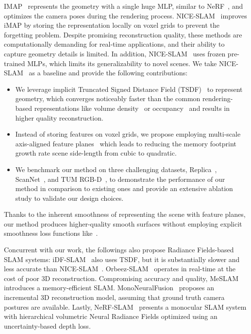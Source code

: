 IMAP~\cite{sucar2021imap} represents the geometry with a single huge MLP, similar to NeRF~\cite{mildenhall2020nerf}, and optimizes the camera poses during the rendering process. NICE-SLAM~\cite{zhu2022nice} improves iMAP by storing the representation locally on voxel grids to prevent the forgetting problem. Despite promising reconstruction quality, these methods are computationally demanding for real-time applications, and their ability to capture geometry details is limited. In addition, NICE-SLAM~\cite{zhu2022nice} uses frozen pre-trained MLPs, which limits its generalizability to novel scenes. We take NICE-SLAM~\cite{zhu2022nice} as a baseline and provide the following contributions:
\begin{itemize}
	\item We leverage implicit Truncated Signed Distance Field (TSDF)~\cite{azinovic2022neural} to represent geometry, which converges noticeably faster than the common rendering-based representations like volume density~\cite{sucar2021imap} or occupancy~\cite{zhu2022nice} and results in higher quality reconstruction.
	
	\item Instead of storing features on voxel grids, we propose employing multi-scale axis-aligned feature planes~\cite{chan2022efficient} which leads to reducing the memory footprint growth rate \wrt scene side-length from cubic to quadratic.
	
	\item We benchmark our method on three challenging datasets, Replica~\cite{replica19arxiv}, ScanNet~\cite{dai2017scannet}, and TUM RGB-D~\cite{sturm2012benchmark}, to demonstrate the performance of our method in comparison to existing ones and provide an extensive ablation study to validate our design choices. 
	
\end{itemize}
Thanks to the inherent smoothness of representing the scene with feature planes, our method produces higher-quality smooth surfaces without employing explicit smoothness loss functions like~\cite{wang2022go}.

Concurrent with our work, the followings also propose Radiance Fields-based SLAM systems: iDF-SLAM~\cite{ming2022idf} also uses TSDF, but it is substantially slower and less accurate than NICE-SLAM~\cite{zhu2022nice}. Orbeez-SLAM~\cite{chung2022orbeez} operates in real-time at the cost of poor 3D reconstruction. Compromising accuracy and quality, MeSLAM~\cite{kruzhkov2022meslam} introduces a memory-efficient SLAM. MonoNeuralFusion~\cite{zou2022mononeuralfusion} proposes an incremental 3D reconstruction model, assuming that ground truth camera postures are available. Lastly, NeRF-SLAM~\cite{rosinol2022nerf} presents a monocular SLAM system with hierarchical volumetric Neural Radiance Fields optimized using an uncertainty-based depth loss.

